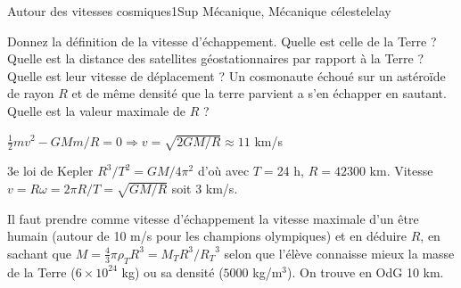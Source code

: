 
\begin{exercise}{Autour des vitesses cosmiques}{1}{Sup}
{Mécanique, Mécanique céleste}{lelay}


\begin{questions}
    \questioncours Donnez la définition de la vitesse d'échappement. Quelle est celle de la Terre ?
    \question Quelle est la distance des satellites géostationnaires par rapport à la Terre ? Quelle est leur vitesse de déplacement ?
    \question Un cosmonaute échoué sur un astéroïde de rayon $R$ et de même densité que la terre parvient a s’en échapper en sautant. Quelle est la valeur maximale de $R$ ?
\end{questions}

\end{exercise}

\begin{solution}

\begin{questions}
    \questioncours $\frac12 m v ^2 - GMm/R = 0 \Rightarrow v =\sqrt{2GM/R} \approx 11$ km/s
    
    \question 3e loi de Kepler $R^3/T^2 = GM/4\pi^2$ d'où avec $T = $24 h, $R = 42300$ km. Vitesse $v = R\omega = 2\pi R/T = \sqrt{GM/R}$ soit 3 km/s.
    
    \question Il faut prendre comme vitesse d'échappement la vitesse maximale d'un être humain (autour de 10 m/s pour les champions olympiques) et en déduire $R$, en sachant que $M = \frac43 \pi \rho_T R^3 = M_T R^3/{R_T}^3$ selon que l'élève connaisse mieux la masse de la Terre ($6\times 10^{24}$ kg) ou sa densité ($5000$ kg/m$^3$). On trouve en OdG 10 km.
\end{questions}

\end{solution}
